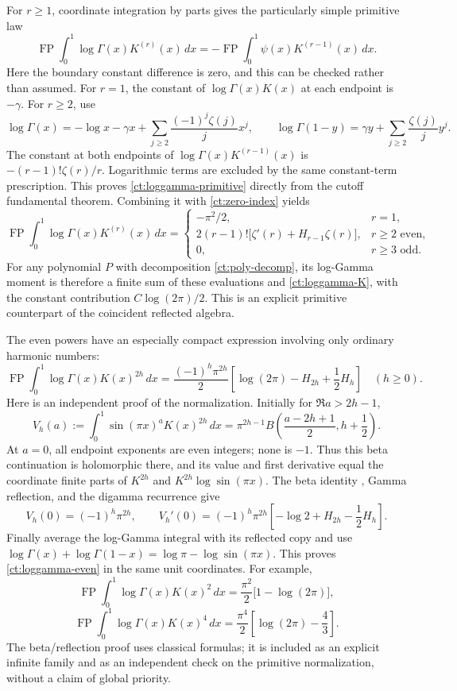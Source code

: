 For $r\ge1$, coordinate integration by parts gives the particularly
simple primitive law
\begin{equation}\label{ct:loggamma-primitive}
 \operatorname{FP}\int_0^1\log\Gamma(x)K^{(r)}(x)\,dx
       =-\operatorname{FP}\int_0^1\psi(x)K^{(r-1)}(x)\,dx.
\end{equation}
Here the boundary constant difference is zero, and this can be checked
rather than assumed. For $r=1$, the constant of $\log\Gamma(x)K(x)$
at each endpoint is $-\gamma$. For $r\ge2$, use
\[
 \log\Gamma(x)=-\log x-\gamma x+
     \sum_{j\ge2}\frac{(-1)^j\zeta(j)}j x^j,
 \qquad
 \log\Gamma(1-y)=\gamma y+
     \sum_{j\ge2}\frac{\zeta(j)}j y^j.
\]
The constant at both endpoints of
$\log\Gamma(x)K^{(r-1)}(x)$ is
$-(r-1)!\zeta(r)/r$. Logarithmic terms are excluded by the same
constant-term prescription. This proves \eqref{ct:loggamma-primitive}
directly from the cutoff fundamental theorem.
Combining it with \eqref{ct:zero-index} yields
\[
 \operatorname{FP}\int_0^1\log\Gamma(x)K^{(r)}(x)\,dx
 =\begin{cases}
 -\pi^2/2,&r=1,\\
 2(r-1)!\bigl[\zeta'(r)+H_{r-1}\zeta(r)\bigr],&r\ge2\text{ even},\\
 0,&r\ge3\text{ odd}.
 \end{cases}
\]
For any polynomial $P$ with decomposition \eqref{ct:poly-decomp}, its
log-Gamma moment is therefore a finite sum of these evaluations and
\eqref{ct:loggamma-K}, with the constant contribution
$C\log(2\pi)/2$. This is an explicit primitive counterpart of the
coincident reflected algebra.

The even powers have an especially compact expression involving only
ordinary harmonic numbers:
\begin{equation}\label{ct:loggamma-even}
 \boxed{\displaystyle
 \operatorname{FP}\int_0^1\log\Gamma(x)K(x)^{2h}\,dx
 =\frac{(-1)^h\pi^{2h}}2
       \left[\log(2\pi)-H_{2h}+\frac12H_h\right]
       \quad(h\ge0).}
\end{equation}
Here is an independent proof of the normalization. Initially for
$\Re a>2h-1$,
\[
 V_h(a):=\int_0^1\sin(\pi x)^aK(x)^{2h}\,dx
  =\pi^{2h-1}B\left(\frac{a-2h+1}{2},h+\frac12\right).
\]
At $a=0$, all endpoint exponents are even integers; none is $-1$.
Thus this beta continuation is holomorphic there, and its value and
first derivative equal the coordinate finite parts of $K^{2h}$ and
$K^{2h}\log\sin(\pi x)$. The beta identity \cite{DLMFBeta}, Gamma reflection, and the digamma recurrence \cite{DLMFGamma}
give
\[
 V_h(0)=(-1)^h\pi^{2h},\qquad
 V_h'(0)=(-1)^h\pi^{2h}
       \left[-\log2+H_{2h}-\frac12H_h\right].
\]
Finally average the log-Gamma integral with its reflected copy and use
$\log\Gamma(x)+\log\Gamma(1-x)=\log\pi-\log\sin(\pi x)$.
This proves \eqref{ct:loggamma-even} in the same unit coordinates.
For example,
\[
 \operatorname{FP}\int_0^1\log\Gamma(x)K(x)^2\,dx
   =\frac{\pi^2}{2}\bigl[1-\log(2\pi)\bigr],
\]
\[
 \operatorname{FP}\int_0^1\log\Gamma(x)K(x)^4\,dx
   =\frac{\pi^4}{2}\left[\log(2\pi)-\frac43\right].
\]
The beta/reflection proof uses classical formulas; it is included as an
explicit infinite family and as an independent check on the primitive
normalization, without a claim of global priority.

